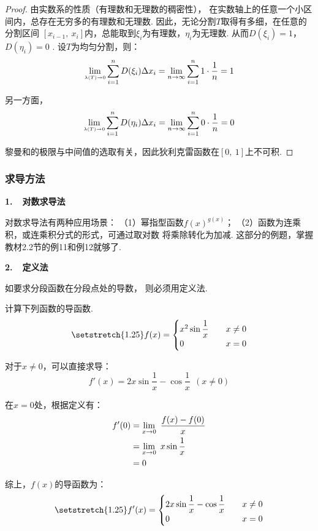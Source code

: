 \begin{proof}
由实数系的性质（有理数和无理数的稠密性），
在实数轴上的任意一个小区间内，总存在无穷多的有理数和无理数.
因此，无论分割$T$取得有多细，在任意的分割区间
$[x_{i-1},~x_{i}]$内，总能取到$\xi_{i}$为有理数，$\eta_{i}$为无理数.
从而$D(\xi_{i}) =1 $，$D(\eta_{i}) =0$ .
设$T$为均匀分割，则：
$$
\lim\limits_{\scriptscriptstyle\lambda(T)\to 0}\sum_{i=1}^{n}D(\xi_{i})\Delta x_{i}
= \lim\limits_{n \to \infty} \sum_{i=1}^{n} 1\cdot\frac{1}{n}
=1
$$

另一方面，
$$
\lim\limits_{\scriptscriptstyle\lambda(T)\to 0}\sum_{i=1}^{n}D(\eta_{i})\Delta x_{i}
= \lim\limits_{n \to \infty} \sum_{i=1}^{n} 0\cdot \frac{1}{n}
=0
$$

黎曼和的极限与中间值的选取有关，因此狄利克雷函数在$[0,~1]$上不可积.
\end{proof}

\subsubsection{求导方法}\vspace{0.25em}

\textbf{1.~~对数求导法}\vspace{0.25em}

对数求导法有两种应用场景：
（1）幂指型函数$f(x)^{g(x)}$；
（2）函数为连乘积，或连乘积分式的形式，可通过取对数
将乘除转化为加减.
这部分的例题，掌握教材2.2节的例11和例12就够了.\par \vspace{1em}

\textbf{2.~~定义法}\vspace{0.25em}

如要求分段函数在分段点处的导数，
则必须用定义法.

\begin{example}
\label{ex:ch02-03}
计算下列函数的导函数.
\[
\setstretch{1.25}
f(x) =
\begin{cases}
x^{2}\sin{\displaystyle\frac{1}{x}} &\quad x \ne 0 \\
0 &\quad x = 0
\end{cases}
\]
\end{example}

\begin{solution}
对于$x \ne 0$，可以直接求导：
$$
f'(x) = 2x\sin{\displaystyle\frac{1}{x}}-\cos{\displaystyle\frac{1}{x}}~~(x \ne 0)
$$\par
在$x=0$处，根据定义有：
\begin{equation}
    \begin{aligned}
        f'(0)
        &= \limx0 ~\frac{f(x)-f(0)}{x} \\
        &= \limx0 ~x \sin {\frac{1}{x}} \\
        &= 0
        \nonumber
    \end{aligned}
\end{equation} \par
综上，$f(x)$的导函数为：
\[
\setstretch{1.25}
f'(x) =
\begin{cases}
2x\sin{\displaystyle\frac{1}{x}}-\cos{\displaystyle\frac{1}{x}} &\quad x \ne 0 \\
0 &\quad x = 0
\end{cases}
\] 
\end{solution}

